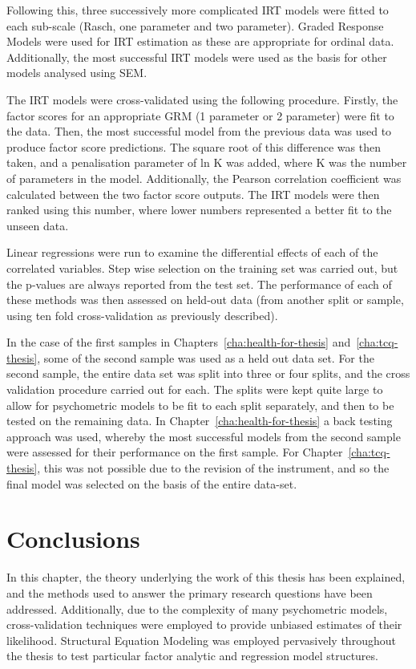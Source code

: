 Following this, three successively more complicated IRT models were fitted to each sub-scale (Rasch, one parameter and two parameter). Graded Response Models were used for IRT estimation as these are appropriate for ordinal data. Additionally, the most successful IRT models were used as the basis for other models analysed using SEM. 

The IRT models were cross-validated using the following procedure. Firstly, the factor scores for an appropriate GRM (1 parameter or 2 parameter) were fit to the data. Then, the most successful model from the previous data was used to produce factor score predictions. The square root of this difference was then taken, and a penalisation parameter of ln K was added, where K was the number of parameters in the model. Additionally, the Pearson correlation coefficient was calculated between the two factor score outputs. The IRT models were then ranked using this number, where lower numbers represented a better fit to the unseen data. 


Linear regressions were run to examine the differential effects of each of the correlated variables. Step wise selection on the training set was carried out, but the p-values are always reported from the test set. The performance of each of these methods was then assessed on held-out data (from another split or sample, using ten fold cross-validation as previously described). 

In the case of the first samples in Chapters~\ref{cha:health-for-thesis} and~\ref{cha:tcq-thesis}, some of the second sample was used as a held out data set. For the second sample, the entire data set was split into three or four splits, and the cross validation procedure carried out for each. The splits were kept quite large  to allow for psychometric models to be fit to each split separately, and then to be tested on the remaining data. In Chapter~\ref{cha:health-for-thesis} a back testing approach was used, whereby the most successful models from the second sample were assessed for their performance on the first sample. For Chapter~\ref{cha:tcq-thesis}, this was not possible due to the revision of the instrument, and so the final model was selected on the basis of the entire data-set. 


\section{Conclusions}
\label{sec:conclusions}


In this chapter, the theory underlying the work of this thesis has been explained, and the methods used to answer the primary research questions have been addressed. Additionally, due to the complexity of many psychometric models, cross-validation techniques were employed to provide unbiased estimates of their likelihood. %
Structural Equation Modeling was employed pervasively throughout the thesis to test particular factor analytic and regression model structures.




